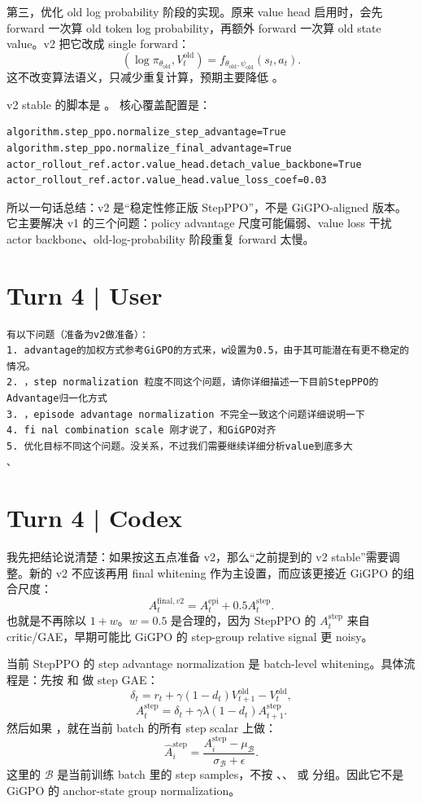 \documentclass[10pt]{ctexart}
\begin{document}
第三，优化 old log probability 阶段的实现。原来 value head 启用时，会先 forward 一次算 old token log probability，再额外 forward 一次算 old state value。v2 把它改成 single forward：
\[
(\log \pi_{\theta_{\mathrm{old}}}, V_t^{\mathrm{old}})
=
f_{\theta_{\mathrm{old}},\psi_{\mathrm{old}}}(s_t,a_t).
\]
这不改变算法语义，只减少重复计算，预期主要降低 。

v2 stable 的脚本是 。
核心覆盖配置是：
\begin{Verbatim}[breaklines=true,breakanywhere=true]
algorithm.step_ppo.normalize_step_advantage=True
algorithm.step_ppo.normalize_final_advantage=True
actor_rollout_ref.actor.value_head.detach_value_backbone=True
actor_rollout_ref.actor.value_head.value_loss_coef=0.03
\end{Verbatim}

所以一句话总结：v2 是“稳定性修正版 StepPPO”，不是 GiGPO-aligned 版本。它主要解决 v1 的三个问题：policy advantage 尺度可能偏弱、value loss 干扰 actor backbone、old-log-probability 阶段重复 forward 太慢。


\section*{Turn 4 | User}
\begin{Verbatim}[breaklines=true,breakanywhere=true]
有以下问题（准备为v2做准备）：
1. advantage的加权方式参考GiGPO的方式来，w设置为0.5，由于其可能潜在有更不稳定的情况。
2. ，step normalization 粒度不同这个问题，请你详细描述一下目前StepPPO的Advantage归一化方式
3. ，episode advantage normalization 不完全一致这个问题详细说明一下
4. fi nal combination scale 刚才说了，和GiGPO对齐
5. 优化目标不同这个问题。没关系，不过我们需要继续详细分析value到底多大
、
\end{Verbatim}

\section*{Turn 4 | Codex}
我先把结论说清楚：如果按这五点准备 v2，那么“之前提到的 v2 stable”需要调整。新的 v2 不应该再用 final whitening 作为主设置，而应该更接近 GiGPO 的组合尺度：
\[
A_t^{\mathrm{final},v2}
=
A_t^{\mathrm{epi}} + 0.5 A_t^{\mathrm{step}}.
\]
也就是不再除以 $1+w$。$w=0.5$ 是合理的，因为 StepPPO 的 $A_t^{\mathrm{step}}$ 来自 critic/GAE，早期可能比 GiGPO 的 step-group relative signal 更 noisy。

当前 StepPPO 的 step advantage normalization 是 batch-level whitening。具体流程是：先按  和  做 step GAE：
\[
\delta_t=r_t+\gamma(1-d_t)V^{\mathrm{old}}_{t+1}-V^{\mathrm{old}}_t,
\]
\[
A_t^{\mathrm{step}}=\delta_t+\gamma\lambda(1-d_t)A_{t+1}^{\mathrm{step}}.
\]
然后如果 ，就在当前 batch 的所有 step scalar 上做：
\[
\widehat A_i^{\mathrm{step}}
=
\frac{A_i^{\mathrm{step}}-\mu_{\mathcal B}}{\sigma_{\mathcal B}+\epsilon}.
\]
这里的 $\mathcal B$ 是当前训练 batch 里的 step samples，不按 、、 或  分组。因此它不是 GiGPO 的 anchor-state group normalization。
\end{document}
